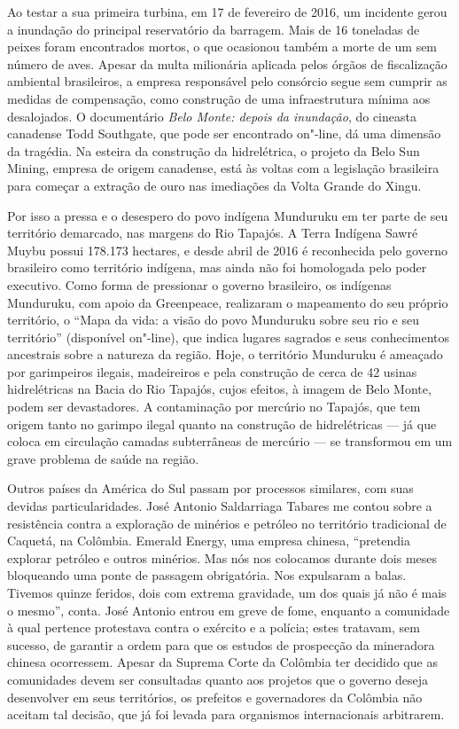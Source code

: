 Ao testar a sua primeira turbina, em 17 de fevereiro de 2016, um
incidente gerou a inundação do principal reservatório da barragem. Mais
de 16 toneladas de peixes foram encontrados mortos, o que ocasionou
também a morte de um sem número de aves. Apesar da multa milionária
aplicada pelos órgãos de fiscalização ambiental brasileiros, a empresa
responsável pelo consórcio segue sem cumprir as medidas de compensação,
como construção de uma infraestrutura mínima aos desalojados. O
documentário \emph{Belo Monte: depois da inundação}, do cineasta canadense Todd
Southgate, que pode ser encontrado on"-line, dá uma dimensão da tragédia.
Na esteira da construção da hidrelétrica, o projeto da Belo Sun Mining,
empresa de origem canadense, está às voltas com a legislação brasileira
para começar a extração de ouro nas imediações da Volta Grande do Xingu.

Por isso a pressa e o desespero do povo indígena Munduruku em ter parte
de seu território demarcado, nas margens do Rio Tapajós. A Terra
Indígena Sawré Muybu possui 178.173 hectares, e desde abril de 2016 é
reconhecida pelo governo brasileiro como território indígena,
mas ainda não foi homologada pelo poder executivo. Como forma de
pressionar o governo brasileiro, os indígenas Munduruku, com apoio da
 Greenpeace, realizaram o mapeamento do seu próprio
território, o ``Mapa da vida: a visão do povo Munduruku sobre seu rio e
seu território'' (disponível on"-line), que indica lugares sagrados e seus
conhecimentos ancestrais sobre a natureza da região. Hoje, o território
Munduruku é ameaçado por garimpeiros ilegais, madeireiros e pela
construção de cerca de 42 usinas hidrelétricas na Bacia do Rio Tapajós,
cujos efeitos, à imagem de Belo Monte, podem ser devastadores. A
contaminação por mercúrio no Tapajós, que tem origem tanto no garimpo
ilegal quanto na construção de hidrelétricas --- já que coloca em circulação
camadas subterrâneas de mercúrio --- se transformou em um grave
problema de saúde na região.

\asterisc

Outros países da América do Sul passam por processos similares, com suas
devidas particularidades. José Antonio Saldarriaga Tabares
me contou sobre a resistência contra a exploração de minérios e petróleo
no território tradicional de Caquetá, na Colômbia. Emerald Energy, uma empresa
chinesa, ``pretendia explorar petróleo e outros minérios. Mas nós nos
colocamos durante dois meses bloqueando uma ponte de passagem
obrigatória. Nos expulsaram a balas. Tivemos quinze feridos, dois com
extrema gravidade, um dos quais já não é mais o mesmo'', conta. José
Antonio entrou em greve de fome, enquanto a comunidade à qual pertence
protestava contra o exército e a polícia; estes tratavam, sem sucesso,
de garantir a ordem para que os estudos de prospecção da mineradora
chinesa ocorressem. Apesar da Suprema Corte da Colômbia ter decidido que
as comunidades devem ser consultadas quanto aos projetos que o governo
deseja desenvolver em seus territórios, os prefeitos e governadores da
Colômbia não aceitam tal decisão, que já foi levada para organismos
internacionais arbitrarem.

